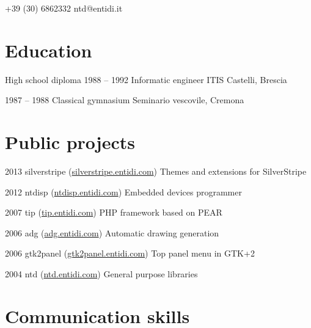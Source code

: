\documentclass[fontsize=10pt]{tccv}
\begin{document}
    {+39 (30) 6862332}
    {ntd@entidi.it}

\section{Education}

\begin{yearlist}

\item[High school diploma]{1988 -- 1992}
     {Informatic engineer}
     {ITIS Castelli, Brescia}

\item{1987 -- 1988}
     {Classical gymnasium}
     {Seminario vescovile, Cremona}

\end{yearlist}

\section{Public projects}

\begin{yearlist}

\item{2013}
     {silverstripe (\href{http://silverstripe.entidi.com/}{silverstripe.entidi.com})}
     {Themes and extensions for SilverStripe}

\item{2012}
     {ntdisp (\href{http://ntdisp.entidi.com/}{ntdisp.entidi.com})}
     {Embedded devices programmer}

\item{2007}
     {tip (\href{http://tip.entidi.com/}{tip.entidi.com})}
     {PHP framework based on PEAR}

\item{2006}
     {adg (\href{http://adg.entidi.com/}{adg.entidi.com})}
     {Automatic drawing generation}

\item{2006}
     {gtk2panel (\href{http://gtk2panel.entidi.com/}{gtk2panel.entidi.com})}
     {Top panel menu in GTK+2}

\item{2004}
     {ntd (\href{http://ntd.entidi.com/}{ntd.entidi.com})}
     {General purpose libraries}

\end{yearlist}

\section{Communication skills}
\end{document}
